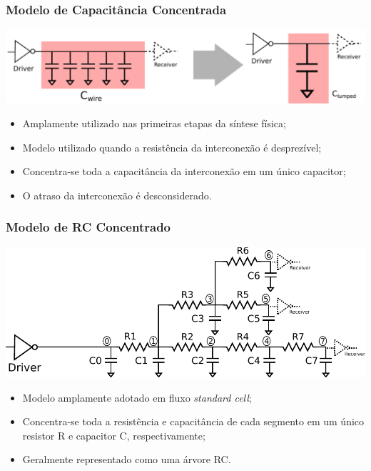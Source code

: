\documentclass[10pt,a4paper]{beamer}
\begin{document}
				\begin{frame}
					\frametitle{Modelo de Capacitância Concentrada}
					\begin{center}
						\includegraphics[width=\textwidth]{img/lumped_c.pdf} 
					\end{center}
					\begin{itemize}
						\item Amplamente utilizado nas primeiras etapas da síntese física;
						\item Modelo utilizado quando a resistência da interconexão é desprezível;
						\item Concentra-se toda a capacitância da interconexão em um único capacitor;
						\item O atraso da interconexão é desconsiderado.
					\end{itemize}							
				\end{frame}
				
				\begin{frame}
					\frametitle{Modelo de RC Concentrado}
					\begin{center}
						\includegraphics[width=\textwidth]{img/lumped_rc.pdf} 
					\end{center}
					\begin{itemize}
						\item Modelo amplamente adotado em fluxo \textit{standard cell};
						\item Concentra-se toda a resistência e capacitância de cada segmento em um único resistor R e capacitor C, respectivamente;
						\item Geralmente representado como uma árvore RC.
					\end{itemize}								
				\end{frame}
			
\end{document}
